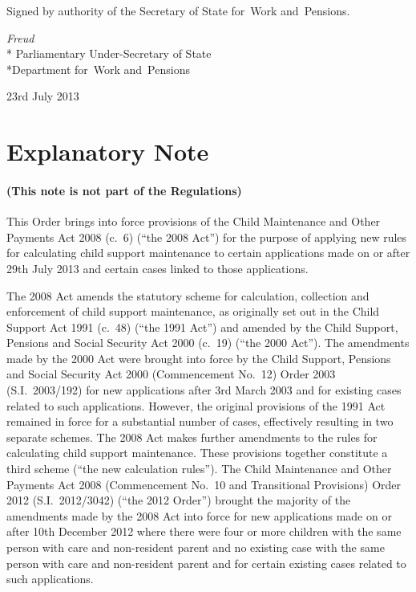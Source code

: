 \documentclass[12pt,a4paper]{article}
\begin{document}
\bigskip

\pagebreak[3]

Signed 
by authority of the 
Secretary of State for~Work and~Pensions.

{\raggedleft
\emph{Freud}\\*
Parliamentary Under-Secretary 
of State\\*Department 
for~Work and~Pensions

}

23rd July 2013

\small

\part{Explanatory Note}

\renewcommand\parthead{— Explanatory Note}

\subsection*{(This note is not part of the Regulations)}

This Order brings into force provisions of the Child Maintenance and Other Payments Act 2008 (c.~6) (“the 2008 Act”) for the purpose of applying new rules for calculating child support maintenance to certain applications made on or after 29th July 2013 and certain cases linked to those applications.

The 2008 Act amends the statutory scheme for calculation, collection and enforcement of child support maintenance, as originally set out in the Child Support Act 1991 (c.~48) (“the 1991 Act”) and amended by the Child Support, Pensions and Social Security Act 2000 (c.~19) (“the 2000 Act”). The amendments made by the 2000 Act were brought into force by the Child Support, Pensions and Social Security Act 2000 (Commencement No.~12) Order 2003 (S.I.~2003/192) for new applications after 3rd March 2003 and for existing cases related to such applications. However, the original provisions of the 1991 Act remained in force for a substantial number of cases, effectively resulting in two separate schemes. The 2008 Act makes further amendments to the rules for calculating child support maintenance. These provisions together constitute a third scheme (“the new calculation rules”). The Child Maintenance and Other Payments Act 2008 (Commencement No.~10 and Transitional Provisions) Order 2012 (S.I.~2012/3042) (“the 2012 Order”) brought the majority of the amendments made by the 2008 Act into force for new applications made on or after 10th December 2012 where there were four or more children with the same person with care and non-resident parent and no existing case with the same person with care and non-resident parent and for certain existing cases related to such applications.
\end{document}
